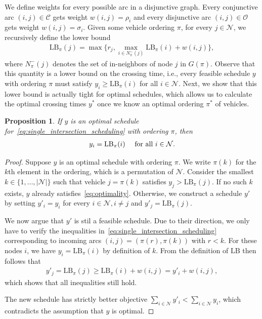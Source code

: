 \documentclass[a4paper]{article}
\theoremstyle{definition}
\theoremstyle{plain}
\newtheorem{proposition}{Proposition}
\begin{document}
We define weights for every possible arc in a disjunctive graph. Every
conjunctive arc $(i, j) \in \mathcal{C}$ gets weight $w(i,j) = \rho_{i}$ and every
disjunctive arc $(i, j) \in \mathcal{O}$ gets weight $w(i,j) = \sigma_{i}$. Given
some vehicle ordering $\pi$, for every $j \in \mathcal{N}$, we recursively define
the lower bound
\begin{align}
  \text{LB}_\pi(j) = \max\{ r_{j}, \max_{i \in N^{-}_{\pi}(j)} \text{LB}_\pi(i) + w(i,j) \} ,
\end{align}
where $N^{-}_{\pi}(j)$ denotes the set of in-neighbors of node $j$ in $G(\pi)$.
Observe that this quantity is a lower bound on the crossing time, i.e., every
feasible schedule $y$ with ordering $\pi$ must satisfy $y_{i} \geq \text{LB}_\pi(i)$
for all $i \in \mathcal{N}$.
%
Next, we show that this lower bound is actually tight for optimal schedules,
which allows us to calculate the optimal crossing times $y^{*}$ once we know an
optimal ordering $\pi^{*}$ of vehicles.


\begin{proposition}\label{prop:active-schedule}
  If $y$ is an optimal schedule
  for~\eqref{eq:single_intersection_scheduling} with ordering $\pi$, then
  \begin{align}
    \label{eq:optimality}
    y_{i} = \text{\upshape LB}_{\pi}(i) \quad \text{ for all } i \in \mathcal{N} .
  \end{align}
\end{proposition}
\begin{proof}
  Suppose $y$ is an optimal schedule with ordering $\pi$. We write $\pi(k)$ for
  the $k$th element in the ordering, which is a permutation of $\mathcal{N}$.
  Consider the smallest $k \in \{1, \dots, |\mathcal{N}|\}$ such that vehicle
  $j = \pi(k)$ satisfies $y_{j} > \text{LB}_\pi(j)$. If no such $k$ exists, $y$
  already satisfies~\eqref{eq:optimality}. Otherwise, we construct a schedule
  $y'$ by setting $y'_{i} = y_{i}$ for every $i \in \mathcal{N}, i \neq j$ and
  $y'_{j} = \text{LB}_\pi(j)$.

  We now argue that $y'$ is stil a feasible schedule. Due to their direction, we
  only have to verify the inequalities
  in~\eqref{eq:single_intersection_scheduling} corresponding to incoming arcs
  $(i, j) = (\pi(r), \pi(k))$ with $r < k$. For these nodes $i$, we have
  $y_{i} = \text{LB}_\pi(i)$ by definition of $k$. From the definition of
  $\text{LB}$ then follows that
  \begin{align*}
    y'_{j} = \text{LB}_\pi(j) \geq \text{LB}_\pi(i) + w(i,j) = y'_{i} + w(i,j) ,
  \end{align*}
  which shows that all inequalities still hold.

  The new schedule has strictly better objective
  $\sum_{i \in \mathcal{N}} y'_{i} < \sum_{i \in \mathcal{N}} y_{i}$, which
  contradicts the assumption that $y$ is optimal.
\end{proof}
\end{document}
